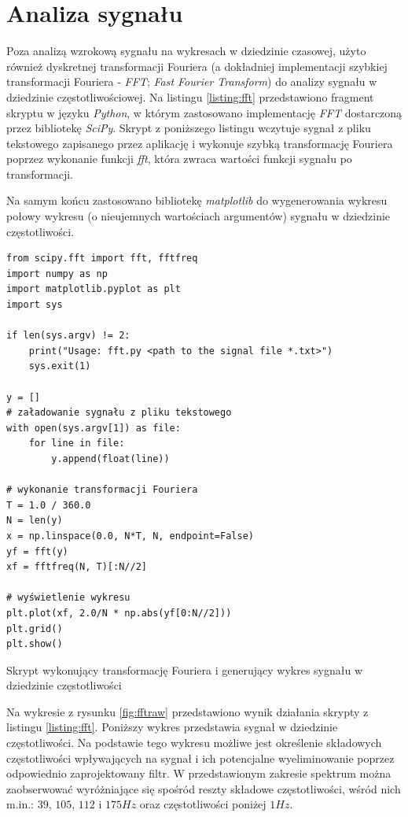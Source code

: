 \newpage

\section{Analiza sygnału}

Poza analizą wzrokową sygnału na wykresach w dziedzinie czasowej, użyto również dyskretnej 
transformacji Fouriera (a dokładniej implementacji szybkiej transformacji Fouriera - \textit{FFT};
\textit{Fast Fourier Transform}) do analizy sygnału w dziedzinie częstotliwościowej. 
Na listingu \ref{listing:fft} przedstawiono fragment skryptu w języku
\textit{Python}, w którym zastosowano implementację \textit{FFT} dostarczoną przez bibliotekę
\textit{SciPy}. Skrypt z poniższego listingu wczytuje sygnał z pliku tekstowego zapisanego
przez aplikację i wykonuje szybką transformację Fouriera poprzez wykonanie funkcji
\textit{fft}, która zwraca wartości funkcji sygnału po transformacji. 

Na samym końcu zastosowano bibliotekę \textit{matplotlib} do wygenerowania wykresu
połowy wykresu (o nieujemnych wartościach argumentów) sygnału w dziedzinie częstotliwości.

\begin{listing}
\begin{verbatim}
from scipy.fft import fft, fftfreq
import numpy as np
import matplotlib.pyplot as plt 
import sys 

if len(sys.argv) != 2:
    print("Usage: fft.py <path to the signal file *.txt>")
    sys.exit(1)

y = []
# załadowanie sygnału z pliku tekstowego
with open(sys.argv[1]) as file:
    for line in file:
        y.append(float(line))            

# wykonanie transformacji Fouriera
T = 1.0 / 360.0
N = len(y)
x = np.linspace(0.0, N*T, N, endpoint=False)
yf = fft(y)
xf = fftfreq(N, T)[:N//2]

# wyświetlenie wykresu
plt.plot(xf, 2.0/N * np.abs(yf[0:N//2]))
plt.grid()
plt.show()
\end{verbatim}
    \caption{Skrypt wykonujący transformację Fouriera i generujący wykres 
sygnału w dziedzinie częstotliwości}
\label{listing:fft}
\end{listing}

\newpage

Na wykresie z rysunku \ref{fig:fftraw} przedstawiono wynik działania skrypty z listingu \ref{listing:fft}. Poniższy
wykres przedstawia sygnał w dziedzinie częstotliwości. Na podstawie tego wykresu możliwe jest określenie 
składowych częstotliwości wpływających na sygnał i ich potencjalne wyeliminowanie poprzez odpowiednio zaprojektowany filtr.
W przedstawionym zakresie spektrum można zaobserwować wyróżniające się spośród reszty składowe częstotliwości, wśród nich m.in.:
$39$, $105$, $112$ i $175 Hz$ oraz częstotliwości poniżej $1 Hz$.

